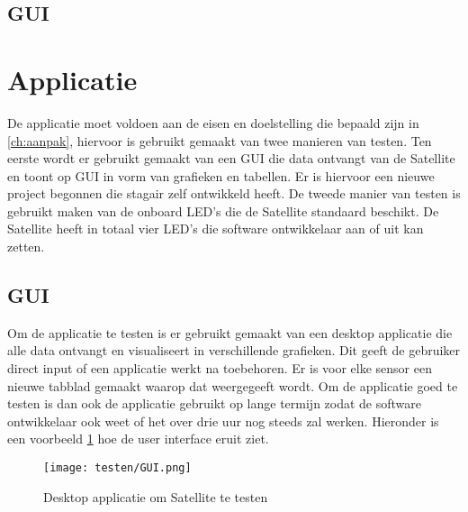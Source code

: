 \newpage

\subsection{GUI}
\section{Applicatie}
De applicatie moet voldoen aan de eisen en doelstelling die bepaald zijn in \ref{ch:aanpak}, hiervoor is gebruikt gemaakt van twee manieren van testen. Ten eerste wordt er gebruikt gemaakt van een GUI die data ontvangt van de Satellite en toont op GUI in vorm van grafieken en tabellen. Er is hiervoor een nieuwe project begonnen die stagair zelf ontwikkeld heeft. De tweede manier van testen is gebruikt maken van de onboard LED's die de Satellite standaard beschikt. De Satellite heeft in totaal vier LED's die software ontwikkelaar aan of uit kan zetten. 



\subsection{GUI}
Om de applicatie te testen is er gebruikt gemaakt van een desktop applicatie die alle data ontvangt en visualiseert in verschillende grafieken. Dit geeft de gebruiker direct input of een applicatie werkt na toebehoren. Er is voor elke sensor een nieuwe tabblad gemaakt waarop dat weergegeeft wordt. Om de applicatie goed te testen is dan ook de applicatie gebruikt op lange termijn zodat de software ontwikkelaar ook weet of het over drie uur nog steeds zal werken. Hieronder is een voorbeeld \ref{fig:guitest} hoe de user interface eruit ziet. 
\begin{figure}[h!]
	\centering
	\caption{Desktop applicatie om Satellite te testen}
	\label{fig:guitest}
	\texttt{[image: testen/GUI.png]}
\end{figure}

\newpage
